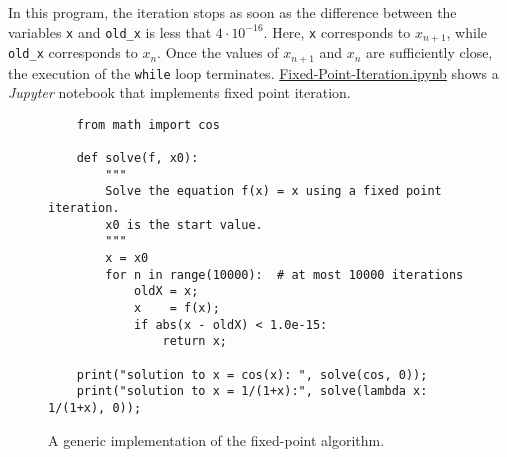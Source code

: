 In this program, the iteration stops as soon as the difference between the variables \texttt{x} and 
\texttt{old\_x} is less that $4 \cdot 10^{-16}$.  Here, \texttt{x} corresponds to $x_{n+1}$, while \texttt{old\_x}
corresponds to $x_n$.  Once the values of $x_{n+1}$ and $x_n$ are sufficiently close, the execution of the \texttt{while} loop
terminates.
\href{https://github.com/karlstroetmann/Logic/blob/master/Python/Fixed-Point-Iteration.ipynb}{Fixed-Point-Iteration.ipynb}
shows a \textsl{Jupyter} notebook that implements fixed point iteration.


\begin{figure}[!ht]
\centering
\begin{verbatim}
    from math import cos
    
    def solve(f, x0):
        """
        Solve the equation f(x) = x using a fixed point iteration.
        x0 is the start value.
        """
        x = x0
        for n in range(10000):  # at most 10000 iterations
            oldX = x;
            x    = f(x);
            if abs(x - oldX) < 1.0e-15: 
                return x;
    
    print("solution to x = cos(x): ", solve(cos, 0));
    print("solution to x = 1/(1+x):", solve(lambda x: 1/(1+x), 0));
\end{verbatim}
\vspace*{-0.3cm}
\caption{A generic implementation of the fixed-point algorithm.}
\label{fig:fixpoint.py}
\end{figure}

